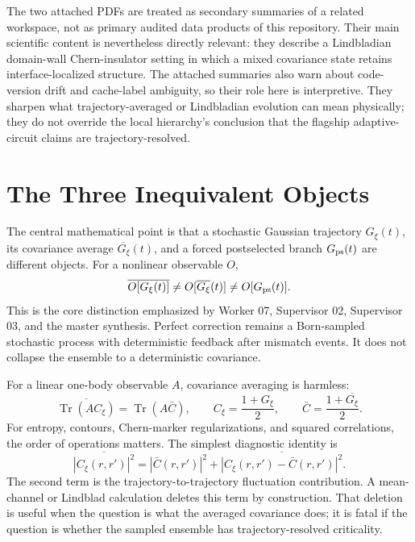 \documentclass[aps,prb,onecolumn,nofootinbib,superscriptaddress]{revtex4-2}
\newcommand{\avg}[1]{\overline{#1}}
\newcommand{\Gtraj}{G_{\xi}}
\newcommand{\Gbar}{\avg{G_{\xi}}}
\newcommand{\Gps}{G_{\rm ps}}
\newcommand{\Tr}{\operatorname{Tr}}
\begin{document}
The two attached PDFs are treated as secondary summaries of a related
workspace, not as primary audited data products of this repository.  Their main
scientific content is nevertheless directly relevant: they describe a
Lindbladian domain-wall Chern-insulator setting in which a mixed covariance
state retains interface-localized structure.  The attached summaries also warn
about code-version drift and cache-label ambiguity, so their role here is
interpretive.  They sharpen what trajectory-averaged or Lindbladian evolution
can mean physically; they do not override the local hierarchy's conclusion that
the flagship adaptive-circuit claims are trajectory-resolved.

\section{The Three Inequivalent Objects}

The central mathematical point is that a stochastic Gaussian trajectory
\(\Gtraj(t)\), its covariance average \(\Gbar(t)\), and a forced postselected
branch \(\Gps(t)\) are different objects.  For a nonlinear observable \(O\),
\begin{equation}
  \avg{O[\Gtraj(t)]}
  \neq
  O[\Gbar(t)]
  \neq
  O[\Gps(t)] .
  \label{eq:three_objects}
\end{equation}
This is the core distinction emphasized by Worker 07, Supervisor 02,
Supervisor 03, and the master synthesis.  Perfect correction remains a
Born-sampled stochastic process with deterministic feedback after mismatch
events.  It does not collapse the ensemble to a deterministic covariance.

For a linear one-body observable \(A\), covariance averaging is harmless:
\begin{equation}
  \avg{\Tr(A C_{\xi})}=\Tr(A \bar C),
  \qquad
  C_{\xi}=\frac{1+\Gtraj}{2},
  \qquad
  \bar C = \frac{1+\Gbar}{2}.
\end{equation}
For entropy, contours, Chern-marker regularizations, and squared correlations,
the order of operations matters.  The simplest diagnostic identity is
\begin{equation}
  \avg{|C_{\xi}(r,r')|^2}
  =
  |\bar C(r,r')|^2
  +
  \avg{|C_{\xi}(r,r')-\bar C(r,r')|^2}.
  \label{eq:square_corr_split}
\end{equation}
The second term is the trajectory-to-trajectory fluctuation contribution.  A
mean-channel or Lindblad calculation deletes this term by construction.  That
deletion is useful when the question is what the averaged covariance does; it is
fatal if the question is whether the sampled ensemble has trajectory-resolved
criticality.
\end{document}
